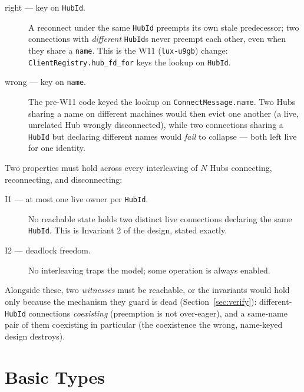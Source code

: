 \documentclass[a4paper,10pt,fleqn]{article}
\begin{document}
\begin{description}
  \item[right --- key on \texttt{HubId}.] A reconnect under the same
    \texttt{HubId} preempts its own stale predecessor; two connections
    with \emph{different} \texttt{HubId}s never preempt each other, even
    when they share a \texttt{name}.  This is the W11 (\texttt{lux-u9gb})
    change: \texttt{ClientRegistry.hub\_fd\_for} keys the lookup on
    \texttt{HubId}.
  \item[wrong --- key on \texttt{name}.] The pre-W11 code keyed the
    lookup on \texttt{ConnectMessage.name}.  Two Hubs sharing a name on
    different machines would then evict one another (a live, unrelated
    Hub wrongly disconnected), while two connections sharing a
    \texttt{HubId} but declaring different names would \emph{fail} to
    collapse --- both left live for one identity.
\end{description}

Two properties must hold across every interleaving of $N$ Hubs
connecting, reconnecting, and disconnecting:

\begin{description}
  \item[I1 --- at most one live owner per \texttt{HubId}.] No reachable
    state holds two distinct live connections declaring the same
    \texttt{HubId}.  This is Invariant 2 of the design, stated exactly.
  \item[I2 --- deadlock freedom.] No interleaving traps the model; some
    operation is always enabled.
\end{description}

Alongside these, two \emph{witnesses} must be reachable, or the
invariants would hold only because the mechanism they guard is dead
(Section~\ref{sec:verify}): different-\texttt{HubId} connections
\emph{coexisting} (preemption is not over-eager), and a same-name pair of
them coexisting in particular (the coexistence the wrong, name-keyed
design destroys).

\section{Basic Types}

\begin{zed}
\end{zed}
\end{document}
